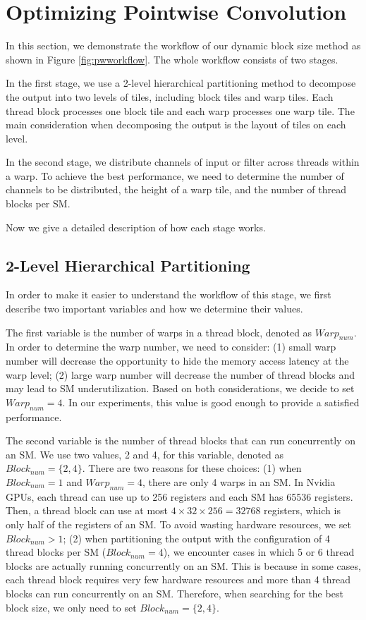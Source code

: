 \section{Optimizing Pointwise Convolution}
\label{sec:pwconv}
In this section, we demonstrate the workflow of our dynamic block size method as shown in Figure \ref{fig:pwworkflow}. 
The whole workflow consists of two stages. 

In the first stage, we use a 2-level hierarchical partitioning method to decompose the output into two levels of tiles, including block tiles and warp tiles. 
Each thread block processes one block tile and each warp processes one warp tile. 
The main consideration when decomposing the output is the layout of tiles on each level.

In the second stage, we distribute channels of input or filter across threads within a warp.
To achieve the best performance, we need to determine the number of channels to be distributed, the height of a warp tile, and the number of thread blocks per SM.

Now we give a detailed description of how each stage works.
\subsection{2-Level Hierarchical Partitioning}
In order to make it easier to understand the workflow of this stage, we first describe two important variables and how we determine their values.

The first variable is the number of warps in a thread block, denoted as $Warp_{num}$.
In order to determine the warp number, we need to consider: (1) small warp number will decrease the opportunity to hide the memory access latency at the warp level;
(2) large warp number will decrease the number of thread blocks and may lead to SM underutilization.
Based on both considerations, we decide to set $Warp_{num}=4$.
In our experiments, this value is good enough to provide a satisfied performance.

The second variable is the number of thread blocks that can run concurrently on an SM.
We use two values, 2 and 4, for this variable, denoted as $Block_{num}=\{2, 4\}$. 
There are two reasons for these choices: 
(1) when $Block_{num}=1$ and $Warp_{num}=4$, there are only 4 warps in an SM. 
In Nvidia GPUs, each thread can use up to 256 registers and each SM has 65536 registers. 
Then, a thread block can use at most $4 \times 32 \times 256=32768$ registers, which is only half of the registers of an SM.
To avoid wasting hardware resources, we set $Block_{num}>1$; 
(2) when partitioning the output with the configuration of 4 thread blocks per SM ($Block_{num}=4$), we encounter cases in which 5 or 6 thread blocks are actually running concurrently on an SM. 
This is because in some cases, each thread block requires very few hardware resources and more than 4 thread blocks can run concurrently on an SM.
Therefore, when searching for the best block size, we only need to set $Block_{num}=\{2,4\}$.

